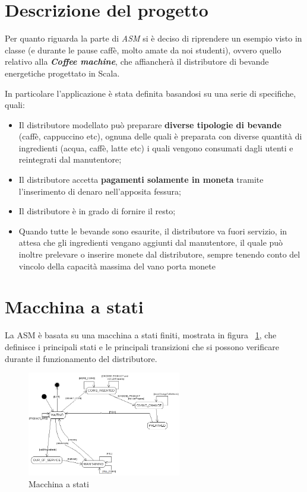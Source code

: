 \section{Descrizione del progetto}
Per quanto riguarda la parte di \textit{ASM} si è deciso di riprendere un esempio visto in classe (e durante le pause caffè, molto amate da noi studenti), ovvero quello relativo alla \textit{\textbf{Coffee machine}}, che affiancherà il distributore di bevande energetiche progettato in Scala.

In particolare l'applicazione è stata definita basandosi su una serie di specifiche, quali:
\begin{itemize}
	\item Il distributore modellato può preparare \textbf{diverse tipologie di bevande} (caffè, cappuccino etc), ognuna delle quali è preparata con diverse quantità di ingredienti (acqua, caffè, latte etc) i quali vengono consumati dagli utenti e reintegrati dal manutentore;
	\item Il distributore accetta \textbf{pagamenti solamente in moneta} tramite l'inserimento di denaro nell'apposita fessura;
	\item Il distributore è in grado di fornire il resto;
	\item Quando tutte le bevande sono esaurite, il distributore va fuori servizio, in attesa che gli ingredienti vengano aggiunti dal manutentore, il quale può inoltre prelevare o inserire monete dal distributore, sempre tenendo conto del vincolo della capacità massima del vano porta monete
\end{itemize}
	

\section{Macchina a stati}
La ASM è basata su una macchina a stati finiti, mostrata in figura ~\ref{fig:StateMachine}, che definisce i principali stati e le principali transizioni che si possono verificare durante il funzionamento del distributore. 
\begin{figure}[h!]
	\centering
	\includegraphics[width=0.6\textwidth]{Immagini/FSM.png}
	\caption{Macchina a stati}
	\label{fig:StateMachine}
\end{figure}

